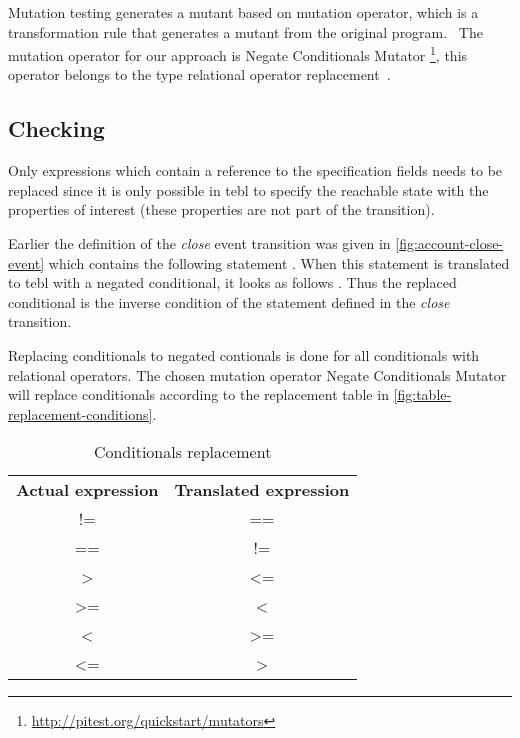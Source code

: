 Mutation testing generates a mutant based on
mutation operator, which is a transformation rule that generates a mutant from
the original program.~\cite[p.~3-4]{jia2011analysis} The mutation operator for
our approach is Negate Conditionals Mutator
\footnote{\url{http://pitest.org/quickstart/mutators}}, this operator belongs to
the type relational operator replacement~\cite[p.~688]{king1991fortran}.


\subsection{Checking}
Only expressions which contain a reference to the specification fields needs to
be replaced since it is only possible in tebl to specify the reachable state
with the properties of interest (these properties are not part of the
transition).

Earlier the definition of the \textit{close} event transition was given in
\autoref{fig:account-close-event} which contains the following statement
. When this statement is translated to tebl
with a negated conditional, it looks as follows
. Thus the replaced conditional is the inverse
condition of the statement defined in the \textit{close} transition.

Replacing conditionals to negated contionals is done for all conditionals with
relational operators. The chosen mutation operator Negate Conditionals Mutator
will replace conditionals according to the replacement table in
\autoref{fig:table-replacement-conditions}.

\begin{table}[h!]
\centering
\begin{tabular}{cc}
\textbf{Actual expression} & \textbf{Translated expression} \\
!=                         & ==                             \\
==                         & !=                             \\
\textgreater               & \textless=                     \\
\textgreater=              & \textless                      \\
\textless                  & \textgreater=                  \\
\textless=                 & \textgreater                   \\
\end{tabular}
\caption{Conditionals replacement}\label{fig:table-replacement-conditions}
\end{table}

